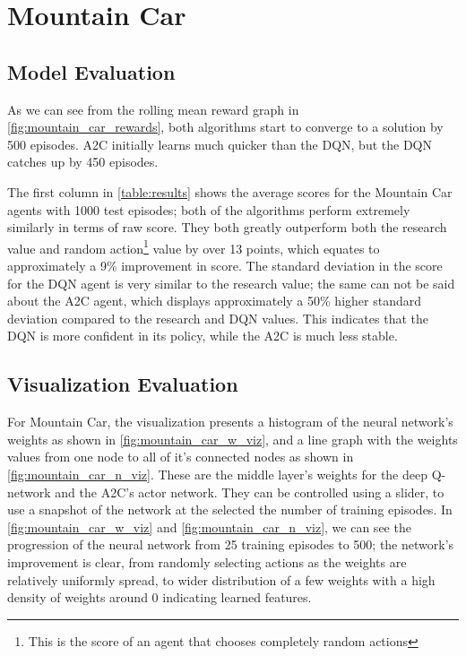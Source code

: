 

\section{Mountain Car}

\subsection{Model Evaluation}

As we can see from the rolling mean reward graph in
\autoref{fig:mountain_car_rewards}, both algorithms start to converge to a
solution by 500 episodes. A2C initially learns much quicker than the DQN, but
the DQN catches up by 450 episodes.



The first column in \autoref{table:results} shows the average scores for the
Mountain Car agents with 1000 test episodes; both of the algorithms perform
extremely similarly in terms of raw score. They both greatly outperform both
the research value and random action\footnote{This is the score of an agent
  that chooses completely random actions} value by over 13 points, which equates
to approximately a 9\% improvement in score. The standard deviation in the
score for the DQN agent is very similar to the research value; the same can not
be said about the A2C agent, which displays approximately a 50\% higher
standard deviation compared to the research and DQN values. This indicates that
the DQN is more confident in its policy, while the A2C is much less stable.

\subsection{Visualization Evaluation}
For Mountain Car, the visualization presents a histogram of the neural
network's weights as shown in \autoref{fig:mountain_car_w_viz}, and a line
graph with the weights values from one node to all of it's connected nodes as
shown in \autoref{fig:mountain_car_n_viz}. These are the middle layer's weights
for the deep Q-network and the A2C's actor network. They can be controlled
using a slider, to use a snapshot of the network at the selected the number of
training episodes. In \autoref{fig:mountain_car_w_viz} and
\autoref{fig:mountain_car_n_viz}, we can see the progression of the neural
network from 25 training episodes to 500; the network's improvement is clear,
from randomly selecting actions as the weights are relatively uniformly spread,
to wider distribution of a few weights with a high density of weights around 0
indicating learned features.

